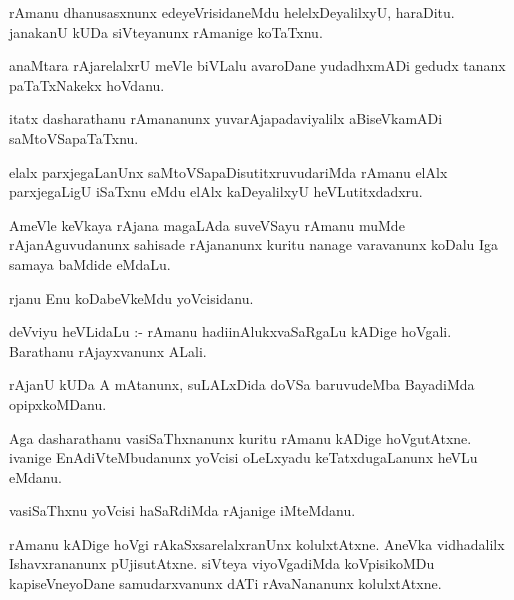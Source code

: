 \documentclass{article}
\begin{document}
\begin{mn}
rAmanu  dhanusasxnunx  edeyeVrisidaneMdu  helelxDeyalilxyU,  haraDitu.  janakanU  kUDa  siVteyanunx  rAmanige  koTaTxnu.
\end{mn}

\begin{mn}
anaMtara  rAjarelalxrU  meVle  biVLalu  avaroDane  yudadhxmADi  gedudx  tananx  paTaTxNakekx  hoVdanu.
\end{mn}

\begin{mn}
itatx   dasharathanu  rAmananunx  yuvarAjapadaviyalilx  aBiseVkamADi  saMtoVSapaTaTxnu.
\end{mn}

\begin{mn}
elalx  parxjegaLanUnx  saMtoVSapaDisutitxruvudariMda  rAmanu  elAlx  parxjegaLigU  iSaTxnu  eMdu  elAlx  kaDeyalilxyU  heVLutitxdadxru.
\end{mn}

\begin{mn}
AmeVle  keVkaya  rAjana  magaLAda  suveVSayu  rAmanu  muMde  rAjanAguvudanunx  sahisade  rAjananunx  kuritu  nanage  varavanunx  
koDalu  Iga  samaya  baMdide  eMdaLu.
\end{mn}

\begin{mn}
rjanu  Enu  koDabeVkeMdu  yoVcisidanu.
\end{mn}

\begin{mn}
deVviyu  heVLidaLu :- rAmanu  hadiinAlukxvaSaRgaLu  kADige hoVgali.  Barathanu  rAjayxvanunx  ALali.
\end{mn}

\begin{mn}
rAjanU  kUDa  A  mAtanunx,  suLALxDida  doVSa  baruvudeMba  BayadiMda  opipxkoMDanu.
\end{mn}

\begin{mn}
Aga  dasharathanu  vasiSaThxnanunx  kuritu  rAmanu  kADige  hoVgutAtxne.  ivanige  EnAdiVteMbudanunx  yoVcisi  oLeLxyadu  
keTatxdugaLanunx  heVLu  eMdanu.
\end{mn}

\begin{mn}
vasiSaThxnu  yoVcisi  haSaRdiMda  rAjanige  iMteMdanu.
\end{mn}

\begin{mn}
rAmanu  kADige  hoVgi  rAkaSxsarelalxranUnx  kolulxtAtxne.  AneVka  vidhadalilx  Ishavxrananunx  pUjisutAtxne.  siVteya  
viyoVgadiMda  koVpisikoMDu  kapiseVneyoDane  samudarxvanunx  dATi  rAvaNananunx  kolulxtAtxne.
\end{mn}
\end{document}
